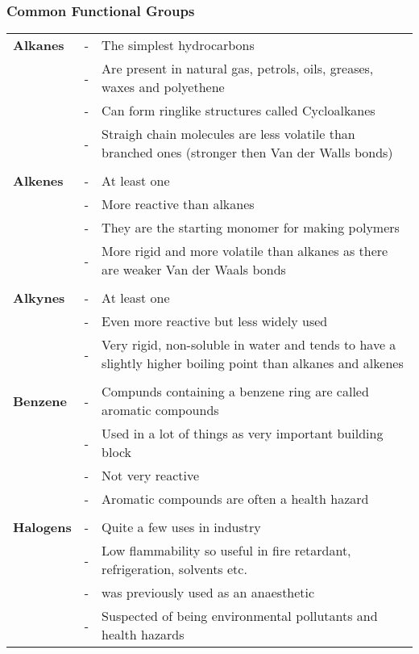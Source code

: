 \documentclass[a4paper, 12pt]{article}
\begin{document}
		\subsubsection*{Common Functional Groups}
			\begin{tabularx}{\textwidth}{l l X}
				\textbf{Alkanes} &-&The simplest hydrocarbons \\
				& - & Are present in natural gas, petrols, oils, greases, waxes and polyethene \\
				& - & Can form ringlike structures called Cycloalkanes \\
				& - & Straigh chain molecules are less volatile than branched ones (stronger then Van der Walls bonds) \\
				&&\\
				\textbf{Alkenes} & - & At least one \ce{C=C} \\
				& -&More reactive than alkanes \\
				&-&They are the starting monomer for making polymers \\
				&-& More rigid and more volatile than alkanes as there are weaker Van der Waals bonds \\
				&&\\
				\textbf{Alkynes} & -& At least one \ce{C#C} \\
				&-&Even more reactive but less widely used \\
				&-&Very rigid, non-soluble in water and tends to have a slightly higher boiling point than alkanes and alkenes \\
				&&\\
				\textbf{Benzene}&-&Compunds containing a benzene ring are called aromatic compounds \\
				&-&Used in a lot of things as very important building block \\
				&-&Not very reactive \\
				&-& Aromatic compounds are often a health hazard \\
				&&\\
				\textbf{Halogens} &-&Quite a few uses in industry \\
				&-& Low flammability so useful in fire retardant, refrigeration, solvents etc. \\
				&-& \ce{CHCl3} was previously used as an anaesthetic \\
				&-& Suspected of being environmental pollutants and health hazards \\
			\end{tabularx}		
		
	
\end{document}
